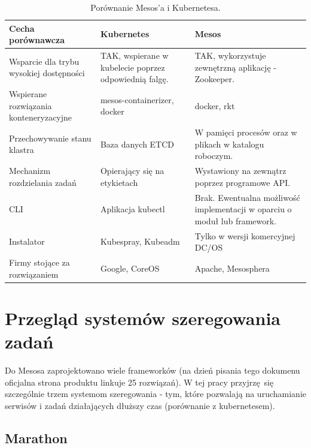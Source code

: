 \documentclass[10pt,a4paper,titlepage,twoside]{report}
\begin{document}
\begin{table}[!htbp]
\caption{Porównanie Mesos'a i Kubernetesa.}
\label{k8s_mesos_comparision}
\centering
\begin{tabular}{|p{4cm}|p{6cm}|p{6cm}|}
  \hline
  \textbf{Cecha porównawcza} & \textbf{Kubernetes} & \textbf{Mesos}\\
  \hline
  Wsparcie dla trybu wysokiej dostępności & TAK, wspierane w kubelecie poprzez odpowiednią falgę. & TAK, wykorzystuje zewnętrzną aplikację - Zookeeper. \\
  \hline
  Wspierane rozwiązania konteneryzacyjne & mesos-containerizer, docker & docker, rkt \\
  \hline
  Przechowywanie stanu klastra & Baza danych ETCD & W pamięci procesów oraz w plikach w katalogu roboczym. \\
  \hline
  Mechanizm rozdzielania zadań & Opierający się na etykietach & Wystawiony na zewnątrz poprzez programowe API. \\
  \hline
  CLI & Aplikacja kubectl & Brak. Ewentualna możliwość implementacji w oparciu o moduł lub framework. \\
  \hline
  Instalator & Kubespray, Kubeadm & Tylko w wersji komercyjnej DC/OS \\
  \hline
  Firmy stojące za rozwiązaniem & Google, CoreOS & Apache, Mesosphera \\
  \hline
\end{tabular}
\end{table}

\newpage

\section{Przegląd systemów szeregowania zadań}

Do Mesosa zaprojektowano wiele frameworków (na dzień pisania tego dokumenu oficjalna strona produktu linkuje 25 rozwiązań). W tej pracy przyjrzę się szczególnie trzem systemom szeregowania - tym, które pozwalają na uruchamianie serwisów i zadań działających dłuższy czas (porównanie z kubernetesem). 

\subsection{Marathon}
\end{document}

